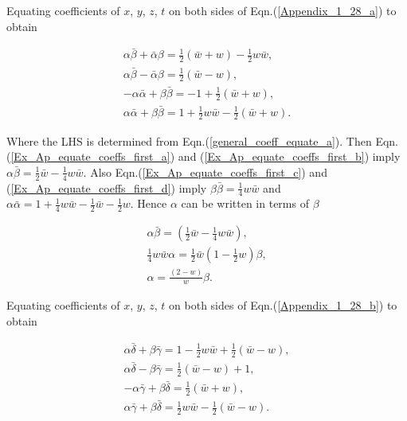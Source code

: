 \begin{appendix}
\noindent Equating coefficients of $x$, $y$, $z$, $t$ on both sides of Eqn.(\ref{Appendix_1_28_a}) to obtain

\begin{subequations}
\begin{gather}
\label{Ex_Ap_equate_coeffs_first_a}
\alpha \bar{\beta} + \bar{\alpha} \beta = \frac{1}{2}(\bar{w}+w) - \frac{1}{2}w\bar{w}, 
\\\label{Ex_Ap_equate_coeffs_first_b}
\alpha \bar{\beta} - \bar{\alpha} \beta = \frac{1}{2} (\bar{w} - w), 
\\\label{Ex_Ap_equate_coeffs_first_c}
-\alpha \bar{\alpha} + \beta \bar{\beta} = - 1 + \frac{1}{2}(\bar{w} + w), 
\\\label{Ex_Ap_equate_coeffs_first_d}
\alpha \bar{\alpha} + \beta \bar{\beta} = 1 + \frac{1}{2}w\bar{w} - \frac{1}{2}(\bar{w} + w). 
\end{gather}
\end{subequations}

\noindent Where the LHS is determined from Eqn.(\ref{general_coeff_equate_a}). Then Eqn.(\ref{Ex_Ap_equate_coeffs_first_a}) and (\ref{Ex_Ap_equate_coeffs_first_b}) imply $\alpha \bar{\beta} = \frac{1}{2}\bar{w} - \frac{1}{4}w\bar{w}$. Also Eqn.(\ref{Ex_Ap_equate_coeffs_first_c}) and (\ref{Ex_Ap_equate_coeffs_first_d}) imply $\beta\bar{\beta} = \frac{1}{4}w\bar{w}$ and $\alpha \bar{\alpha} = 1 + \frac{1}{4}w\bar{w} - \frac{1}{2}\bar{w} - \frac{1}{2}w$. Hence $\alpha$ can be written in terms of $\beta$

\begin{gather*}
\alpha \bar{\beta} = (\frac{1}{2}\bar{w} - \frac{1}{4}w\bar{w}), \\
\frac{1}{4} w \bar{w} \alpha = \frac{1}{2}\bar{w}(1-\frac{1}{2}w)\beta, \\
\alpha = \frac{(2-w)}{w}\beta.
\end{gather*}

Equating coefficients of $x$, $y$, $z$, $t$ on both sides of Eqn.(\ref{Appendix_1_28_b}) to obtain

\begin{subequations}
\begin{gather}\label{Ex_Ap_equate_coeffs_second_a}
\alpha \bar{\delta} + \beta\bar{\gamma} = 1 - \frac{1}{2}w\bar{w} + \frac{1}{2}(\bar{w}-w), \\\label{Ex_Ap_equate_coeffs_second_b}
\alpha \bar{\delta} - \beta\bar{\gamma} = \frac{1}{2}(\bar{w}-w) + 1,\\\label{Ex_Ap_equate_coeffs_second_c}
-\alpha\bar{\gamma} + \beta \bar{\delta} = \frac{1}{2}(\bar{w} + w) ,\\\label{Ex_Ap_equate_coeffs_second_d}
\alpha\bar{\gamma} + \beta \bar{\delta} = \frac{1}{2}w\bar{w} - \frac{1}{2}(\bar{w}-w). 
\end{gather}
\end{subequations}


\end{appendix}
